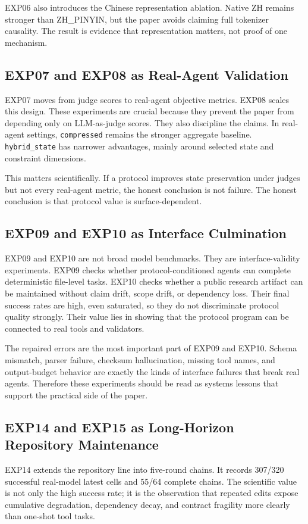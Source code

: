 \documentclass[11pt]{article}
\begin{document}
EXP06 also introduces the Chinese representation ablation. Native ZH remains stronger than ZH\_PINYIN, but the paper avoids claiming full tokenizer causality. The result is evidence that representation matters, not proof of one mechanism.

\subsection{EXP07 and EXP08 as Real-Agent Validation}
EXP07 moves from judge scores to real-agent objective metrics. EXP08 scales this design. These experiments are crucial because they prevent the paper from depending only on LLM-as-judge scores. They also discipline the claims. In real-agent settings, \texttt{compressed} remains the stronger aggregate baseline. \texttt{hybrid\_state} has narrower advantages, mainly around selected state and constraint dimensions.

This matters scientifically. If a protocol improves state preservation under judges but not every real-agent metric, the honest conclusion is not failure. The honest conclusion is that protocol value is surface-dependent.

\subsection{EXP09 and EXP10 as Interface Culmination}
EXP09 and EXP10 are not broad model benchmarks. They are interface-validity experiments. EXP09 checks whether protocol-conditioned agents can complete deterministic file-level tasks. EXP10 checks whether a public research artifact can be maintained without claim drift, scope drift, or dependency loss. Their final success rates are high, even saturated, so they do not discriminate protocol quality strongly. Their value lies in showing that the protocol program can be connected to real tools and validators.

The repaired errors are the most important part of EXP09 and EXP10. Schema mismatch, parser failure, checksum hallucination, missing tool names, and output-budget behavior are exactly the kinds of interface failures that break real agents. Therefore these experiments should be read as systems lessons that support the practical side of the paper.

\subsection{EXP14 and EXP15 as Long-Horizon Repository Maintenance}
EXP14 extends the repository line into five-round chains. It records 307/320 successful real-model latest cells and 55/64 complete chains. The scientific value is not only the high success rate; it is the observation that repeated edits expose cumulative degradation, dependency decay, and contract fragility more clearly than one-shot tool tasks.
\end{document}
